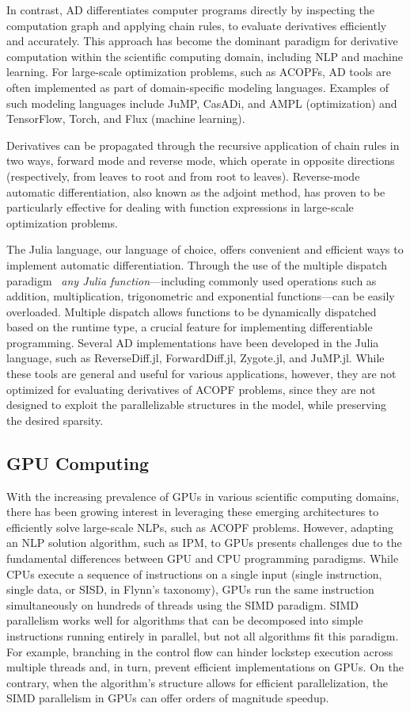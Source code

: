 \documentclass{IEEEtran4PSCC} %
\begin{document}
In contrast, AD differentiates computer
programs directly by inspecting the computation graph and applying chain rules,
to evaluate derivatives efficiently and accurately.
This approach has become the dominant paradigm for derivative computation within the
scientific computing domain, including NLP and
machine learning. For large-scale optimization problems, such as ACOPFs, AD tools are often implemented as part of domain-specific
modeling languages. Examples of such modeling languages include JuMP,
CasADi, and AMPL (optimization) and TensorFlow, Torch, and Flux
(machine learning).

Derivatives can be propagated through the
recursive application of chain rules in two ways, forward mode and 
reverse mode, which operate in opposite directions (respectively, from leaves to
root and from root to leaves). Reverse-mode automatic
differentiation, also known as the adjoint method, has proven to be
particularly effective for dealing with function expressions in
large-scale optimization problems.

The Julia language, our language of choice, offers convenient and
efficient ways to implement automatic differentiation. Through the use
of the multiple dispatch paradigm~\cite{bezanson2017julia} \textit{any
Julia function}---including commonly used operations such as addition,
multiplication, trigonometric and exponential functions---can be easily overloaded. Multiple dispatch allows functions
to be dynamically dispatched based on the runtime type, a crucial
feature for implementing differentiable programming. Several AD
implementations have been developed in the Julia language, such as
ReverseDiff.jl, ForwardDiff.jl, Zygote.jl, and JuMP.jl. While these
tools are general and useful for various applications, however, they are not
optimized for evaluating derivatives of ACOPF problems, since they are
not designed to exploit the parallelizable structures in the model,
while preserving the desired sparsity.


\subsection{GPU Computing}\label{sec:gpu}
With the increasing prevalence of GPUs in various scientific computing
domains, there has been growing interest in leveraging these emerging
architectures to efficiently solve large-scale NLPs, such as ACOPF problems.
However, adapting an NLP solution algorithm,
such as IPM, to GPUs presents challenges due to the fundamental
differences between GPU and CPU programming paradigms. While CPUs
execute a sequence of instructions on a single input (single
instruction, single data, or SISD, in Flynn's taxonomy), GPUs run the
same instruction simultaneously on hundreds of threads using the SIMD
paradigm. SIMD parallelism works well
for algorithms that can be decomposed into simple instructions running
entirely in parallel, but not all algorithms fit this
paradigm. For example, branching in the control flow can hinder
lockstep execution across multiple threads and, in turn, prevent
efficient implementations on GPUs. On the contrary, when the
algorithm's structure allows for efficient parallelization, the SIMD
parallelism in GPUs can offer orders of magnitude speedup.
\end{document}
